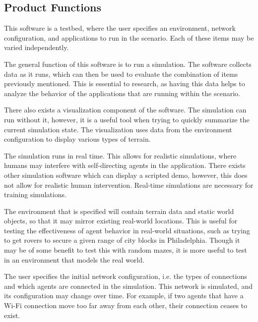 \documentclass[titlepage]{article}
\begin{document}
\subsection{Product Functions%
  \label{product-functions}%
}


This software is a testbed, where the user specifies an environment, network configuration, and applications to run in the scenario. Each of these items may be varied independently.

The general function of this software is to run a simulation.  The software collects data as it runs, which can then be used to evaluate the combination of items previously mentioned.  This is essential to research, as having this data helps to analyze the behavior of the applications that are running within the scenario.

There also exists a visualization component of the software. The simulation can run without it, however, it is a useful tool when trying to quickly summarize the current simulation state.  The visualization uses data from the environment configuration to display various types of terrain.

The simulation runs in real time.  This allows for realistic simulations, where humans may interfere with self-directing agents in the application. There exists other simulation software which can display a scripted demo, however, this does not allow for realistic human intervention.  Real-time simulations are necessary for training simulations.

The environment that is specified will contain terrain data and static world objects, so that it may mirror existing real-world locations.  This is useful for testing the  effectiveness of agent behavior in real-world situations, such as trying to get rovers to secure a given range of city blocks in Philadelphia. Though it may be of some benefit to test this with random mazes, it is more useful to test in an environment that models the real world.

The user specifies the initial network configuration, i.e. the types of connections and which agents are connected in the simulation.  This network is simulated, and its configuration may change over time. For example, if two agents that have a Wi-Fi connection move too far away from each other, their connection ceases to exist. 

\end{document}
